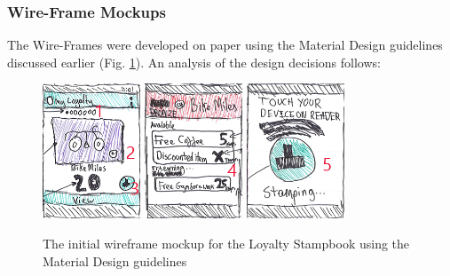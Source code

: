 \subsubsection{Wire-Frame Mockups}
The Wire-Frames were developed on paper using the Material Design guidelines discussed earlier (Fig. \ref{fig:wireframe1}). An analysis of the design decisions follows: 
\begin{figure}[H]
 \centering
  \includegraphics[width=0.26\textwidth]{img/wireframeMockup.png}
    \includegraphics[width=0.26\textwidth]{img/wireframeMockup2.png}
    \includegraphics[width=0.26\textwidth]{img/wireframeMockup3.png}
    \caption{The initial wireframe mockup for the Loyalty Stampbook using the Material Design guidelines}
         \label{fig:wireframe1}
\end{figure}

